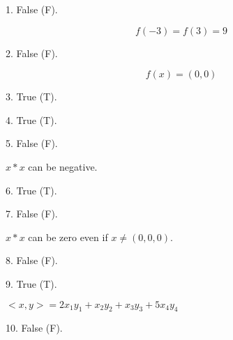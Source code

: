 \documentclass{article}
\begin{document}
1. False (F).

\[f(-3) = f(3) = 9\]

2. False (F).

\[f(x) = (0, 0)\]

3. True (T).

4. True (T).

5. False (F).

$x*x$ can be negative.

6. True (T).

7. False (F).

$x*x$ can be zero even if $x \neq (0, 0, 0)$.

8. False (F).

9. True (T).

$<x, y> = 2x_1 y_1 + x_2 y_2 + x_3 y_3 + 5x_4 y_4$

10. False (F).
\end{document}
